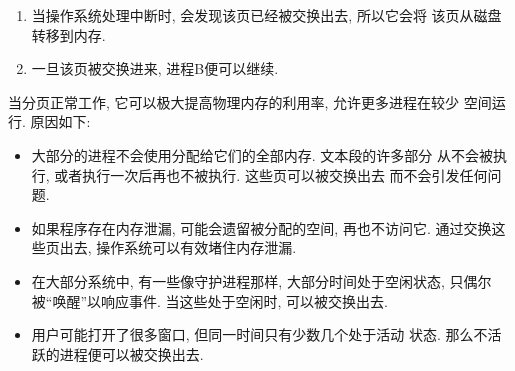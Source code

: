 \documentclass[12pt]{book}
\begin{document}
{\begin{enumerate}
\item 当操作系统处理中断时, 会发现该页已经被交换出去, 所以它会将
该页从磁盘转移到内存.

\item 一旦该页被交换进来, 进程B便可以继续.

\end{enumerate}

当分页正常工作, 它可以极大提高物理内存的利用率, 允许更多进程在较少
空间运行. 原因如下:

\begin{itemize}

\item 大部分的进程不会使用分配给它们的全部内存. 文本段的许多部分
从不会被执行, 或者执行一次后再也不被执行. 这些页可以被交换出去
而不会引发任何问题.

\item 如果程序存在内存泄漏, 可能会遗留被分配的空间, 再也不访问它.
通过交换这些页出去, 操作系统可以有效堵住内存泄漏.

\item 在大部分系统中, 有一些像守护进程那样, 大部分时间处于空闲状态,
只偶尔被``唤醒''以响应事件. 当这些处于空闲时, 可以被交换出去.

\item 用户可能打开了很多窗口, 但同一时间只有少数几个处于活动
状态. 那么不活跃的进程便可以被交换出去.


\end{itemize}}
\end{document}
